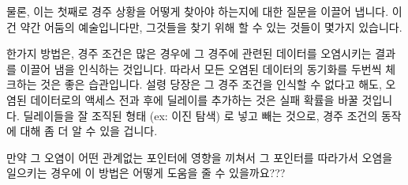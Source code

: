 물론, 이는 첫째로 경주 상황을 어떻게 찾아야 하는지에 대한 질문을 이끌어 냅니다.
이건 약간 어둠의 예술입니다만, 그것들을 찾기 위해 할 수 있는 것들이 몇가지
있습니다.

한가지 방법은, 경주 조건은 많은 경우에 그 경주에 관련된 데이터를 오염시키는
결과를 이끌어 냄을 인식하는 것입니다.
따라서 모든 오염된 데이터의 동기화를 두번씩 체크하는 것은 좋은 습관입니다.
설령 당장은 그 경주 조건을 인식할 수 없다고 해도, 오염된 데이터로의 액세스 전과
후에 딜레이를 추가하는 것은 실패 확률을 바꿀 것입니다.
딜레이들을 잘 조직된 형태 (ex: 이진 탐색) 로 넣고 빼는 것으로, 경주 조건의
동작에 대해 좀 더 알 수 있을 겁니다.

\QuickQuiz{}
	만약 그 오염이 어떤 관계없는 포인터에 영향을 끼쳐서 그 포인터를
	따라가서 오염을 일으키는 경우에 이 방법은 어떻게 도움을 줄 수
	있을까요???
	\iffalse

